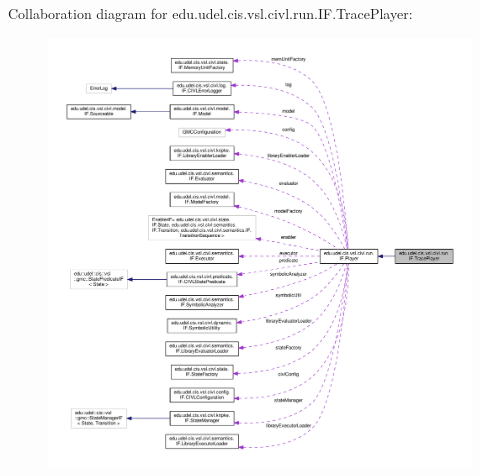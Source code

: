 Collaboration diagram for edu.\+udel.\+cis.\+vsl.\+civl.\+run.\+I\+F.\+Trace\+Player\+:
\nopagebreak
\begin{figure}[H]
\begin{center}
\leavevmode
\includegraphics[width=350pt]{classedu_1_1udel_1_1cis_1_1vsl_1_1civl_1_1run_1_1IF_1_1TracePlayer__coll__graph}
\end{center}
\end{figure}
